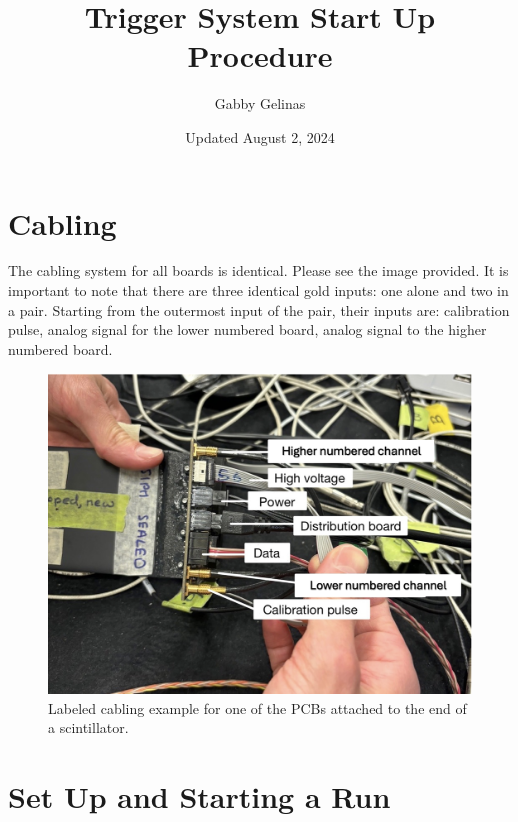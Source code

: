 \documentclass{article}
\title{Trigger System Start Up Procedure}
\author{Gabby Gelinas}
\date{Updated August 2, 2024}
\begin{document}
\maketitle

\section*{Cabling}
The cabling system for all boards is identical. Please see the image provided. It is important to note that there are three identical gold inputs: one alone and two in a pair. Starting from the outermost input of the pair, their inputs are: calibration pulse, analog signal for the lower numbered board, analog signal to the higher numbered board.

\begin{figure}[H]
    \centering
    \includegraphics[scale=0.5]{boardPorts.png}
    \caption{Labeled cabling example for one of the PCBs attached to the end of a scintillator.}
    \label{fig:enter-label}
\end{figure}


\section*{Set Up and Starting a Run}
\end{document}
